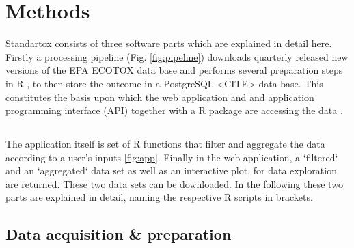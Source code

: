 
\section*{Methods}


Standartox consists of three software parts which are explained in detail here. Firstly a processing pipeline (Fig. \ref{fig:pipeline}) downloads quarterly released new versions of the EPA ECOTOX data base and performs several preparation steps in R \citep{r_core_team_r_2017}, to then store the outcome in a PostgreSQL <CITE> data base. This constitutes the basis upon which the web application and and application programming interface (API) together with a R package are accessing the data \citep{r_core_team_r_2017}. 

\subsection{}



The application itself is set of R functions that filter and aggregate the data according to a user's inputs \ref{fig:app}. Finally in the web application, a `filtered` and an `aggregated` data set as well as an interactive plot, for data exploration are returned. These two data sets can be downloaded. In the following these two parts are explained in detail, naming the respective R scripts in brackets.

\subsection*{Data acquisition \& preparation}



